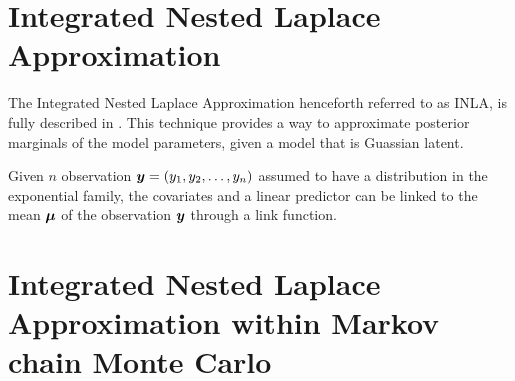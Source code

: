 \chapter{Integrated Nested Laplace Approximation}
\label{chap:inla}


The Integrated Nested Laplace Approximation henceforth referred to as INLA, is fully described in \cite{rue_approximate_2009}.
This technique provides a way to approximate posterior marginals of the model parameters, given a model that is
Guassian latent. 


Given $n$ observation $\bm{y} = (y_1,y_2,\dots,y_n)$ assumed to have a distribution in the exponential family, 
the covariates and a linear predictor can be linked to the mean $\bm{\mu}$ of the observation $\bm{y}$
through a link function. 


\chapter{Integrated Nested Laplace Approximation within Markov chain Monte Carlo}
\label{chap:inlawmcmc}
